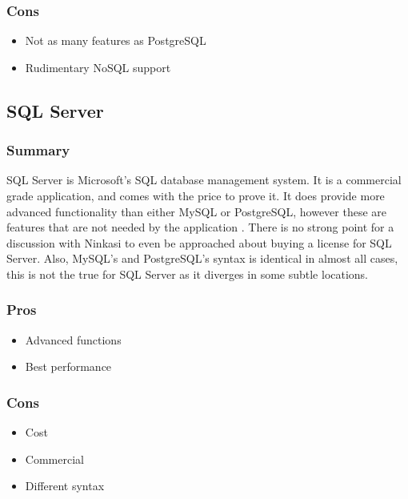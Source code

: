         \subsubsection{Cons}
        \begin{itemize}
            \item Not as many features as PostgreSQL
            \item Rudimentary NoSQL support
        \end{itemize}
        
    \subsection{SQL Server}
    
        \subsubsection{Summary}
        
        SQL Server is Microsoft's SQL database management system.  It is a commercial grade application, and comes with the price to prove it.  It does provide more advanced functionality than either MySQL or PostgreSQL, however these are features that are not needed by the application \cite{sql_server}.  There is no strong point for a discussion with Ninkasi to even be approached about buying a license for SQL Server.  Also, MySQL's and PostgreSQL's syntax is identical in almost all cases, this is not the true for SQL Server as it diverges in some subtle locations.
        
        \subsubsection{Pros}
        \begin{itemize}
            \item Advanced functions
            \item Best performance
        \end{itemize}
        
        \subsubsection{Cons}
        \begin{itemize}
            \item Cost
            \item Commercial
            \item Different syntax
        \end{itemize}
    
